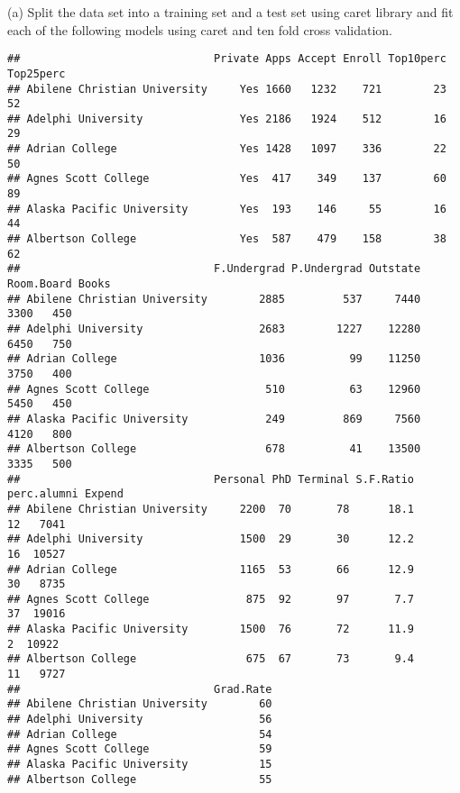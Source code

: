 \documentclass[
  ignorenonframetext,
]{beamer}
\newenvironment{Shaded}{\begin{snugshade}}{\end{snugshade}}
\newcommand{\DataTypeTok}[1]{\textcolor[rgb]{0.13,0.29,0.53}{#1}}
\newcommand{\DecValTok}[1]{\textcolor[rgb]{0.00,0.00,0.81}{#1}}
\newcommand{\KeywordTok}[1]{\textcolor[rgb]{0.13,0.29,0.53}{\textbf{#1}}}
\newcommand{\NormalTok}[1]{#1}
\newcommand{\OperatorTok}[1]{\textcolor[rgb]{0.81,0.36,0.00}{\textbf{#1}}}
\newcommand{\StringTok}[1]{\textcolor[rgb]{0.31,0.60,0.02}{#1}}
\begin{document}
\begin{frame}[fragile]{(a) Split the data set into a training set and a
test set using caret library and fit each of the following models using
caret and ten fold cross validation.}
\begin{verbatim}
##                              Private Apps Accept Enroll Top10perc Top25perc
## Abilene Christian University     Yes 1660   1232    721        23        52
## Adelphi University               Yes 2186   1924    512        16        29
## Adrian College                   Yes 1428   1097    336        22        50
## Agnes Scott College              Yes  417    349    137        60        89
## Alaska Pacific University        Yes  193    146     55        16        44
## Albertson College                Yes  587    479    158        38        62
##                              F.Undergrad P.Undergrad Outstate Room.Board Books
## Abilene Christian University        2885         537     7440       3300   450
## Adelphi University                  2683        1227    12280       6450   750
## Adrian College                      1036          99    11250       3750   400
## Agnes Scott College                  510          63    12960       5450   450
## Alaska Pacific University            249         869     7560       4120   800
## Albertson College                    678          41    13500       3335   500
##                              Personal PhD Terminal S.F.Ratio perc.alumni Expend
## Abilene Christian University     2200  70       78      18.1          12   7041
## Adelphi University               1500  29       30      12.2          16  10527
## Adrian College                   1165  53       66      12.9          30   8735
## Agnes Scott College               875  92       97       7.7          37  19016
## Alaska Pacific University        1500  76       72      11.9           2  10922
## Albertson College                 675  67       73       9.4          11   9727
##                              Grad.Rate
## Abilene Christian University        60
## Adelphi University                  56
## Adrian College                      54
## Agnes Scott College                 59
## Alaska Pacific University           15
## Albertson College                   55
\end{verbatim}

\begin{Shaded}
\end{Shaded}
\end{frame}
\end{document}
